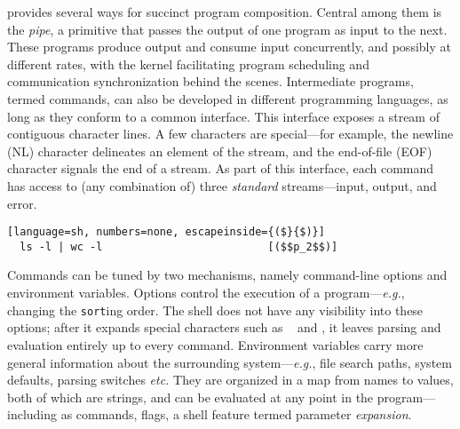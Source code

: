 \documentclass[sigplan,10pt,review,anonymous]{acmart}
\newcommand{\eg}{{\em e.g.}, }
\newcommand{\etc}{{\em etc.}\xspace}
\newcommand{\ttt}[1]{\texttt{\small #1}}
\begin{document}
\unix provides several ways for succinct program composition.
Central among them is the \emph{pipe}, a primitive that passes the output of one program as input to the next.
These programs produce output and consume input concurrently, and possibly at different rates, with the \unix kernel facilitating program scheduling and communication synchronization behind the scenes.
Intermediate programs, termed commands, can also be developed in different programming languages, as long as they conform to a common interface.
This interface exposes a stream of contiguous character lines.
A few characters are special---for example, the newline (\textsc{NL}) character delineates an element of the stream, and the end-of-file (\textsc{EOF}) character signals the end of a stream.
As part of this interface, each command has access to (any combination of) three \emph{standard} streams---input, output, and error.
\smallskip
\begin{lstlisting}[language=sh, numbers=none, escapeinside={($}{$)}]
  ls -l | wc -l                          [($$p_2$$)]
\end{lstlisting}
\smallskip
Commands can be tuned by two mechanisms, namely com\-mand-line options and environment variables.
Options control the execution of a program---\eg changing the \ttt{sort}ing order.
The shell does not have any visibility into these options; 
  after it expands special characters such as \ttt{~} and \ttt{*}, it leaves parsing and evaluation entirely up to every command.
Environment variables carry more general information about the surrounding system---\eg file search paths, system defaults, parsing switches \etc 
They are organized in a map from names to values, both of which are strings, and can be evaluated at any point in the program---including as commands, flags, a shell feature termed parameter \emph{expansion}.
\end{document}
